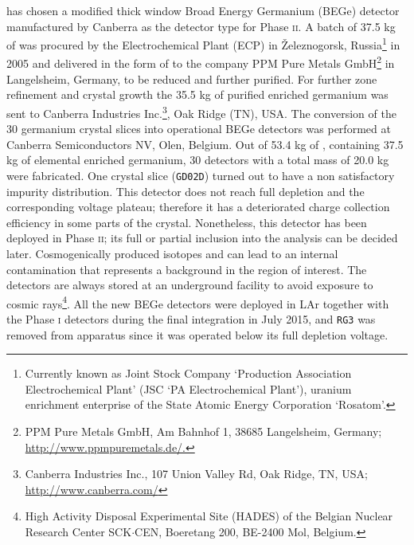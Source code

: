 {\gerda} has chosen a modified thick window Broad Energy Germanium (BEGe) detector manufactured by Canberra as the detector type for Phase \textsc{ii}. A batch of 37.5 kg of  was procured by the Electrochemical Plant (ECP) in Železnogorsk, Russia\footnote{Currently known as Joint Stock Company `Production Association Electrochemical Plant' (JSC `PA Electrochemical Plant'), uranium enrichment enterprise of the State Atomic Energy Corporation `Rosatom'.} in 2005 and delivered in the form of  to the company PPM Pure Metals GmbH\footnote{PPM Pure Metals GmbH, Am Bahnhof 1, 38685 Langelsheim, Germany; \url{http://www.ppmpuremetals.de/.}} in Langelsheim, Germany, to be reduced and further purified. For further zone refinement and crystal growth the 35.5 kg of purified enriched germanium was sent to Canberra Industries Inc.\footnote{Canberra Industries Inc., 107 Union Valley Rd, Oak Ridge, TN, USA; \url{http://www.canberra.com/}}, Oak Ridge (TN), USA. The conversion of the 30 germanium crystal slices into operational BEGe detectors was performed at Canberra Semiconductors NV, Olen, Belgium. Out of 53.4 kg of , containing 37.5 kg of elemental enriched germanium, 30 detectors with a total mass of 20.0 kg were fabricated. One crystal slice (\texttt{GD02D}) turned out to have a non satisfactory impurity distribution. This detector does not reach full depletion and the corresponding voltage plateau; therefore it has a deteriorated charge collection efficiency in some parts of the crystal. Nonetheless, this detector has been deployed in {\gerda} Phase \textsc{ii}; its full or partial inclusion into the analysis can be decided later. Cosmogenically produced isotopes  and  can lead to an internal contamination that represents a background in the region of interest. The detectors are always stored at an underground facility to avoid exposure to cosmic rays\footnote{High Activity Disposal Experimental Site (HADES) of the Belgian Nuclear Research Center SCK$\cdot$CEN, Boeretang 200, BE-2400 Mol, Belgium.}. All the new BEGe detectors were deployed in LAr together with the Phase \textsc{i} detectors during the final integration in July 2015, and \texttt{RG3} was removed from apparatus since it was operated below its full depletion voltage.

